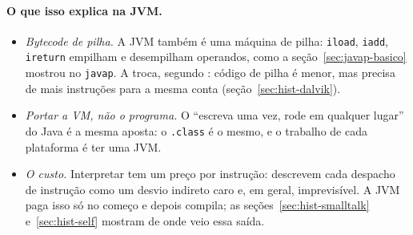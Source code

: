 \paragraph{O que isso explica na JVM.}
\begin{itemize}
\item \emph{Bytecode de pilha.} A JVM também é uma máquina de pilha:
  \texttt{iload}, \texttt{iadd}, \texttt{ireturn} empilham e desempilham
  operandos, como a seção~\ref{sec:javap-basico} mostrou no
  \texttt{javap}. A troca, segundo \textcite{paper:vm-showdown}: código
  de pilha é menor, mas precisa de mais instruções para a mesma conta
  (seção~\ref{sec:hist-dalvik}).
\item \emph{Portar a VM, não o programa.} O \enquote{escreva uma vez, rode
  em qualquer lugar} do Java é a mesma aposta: o \texttt{.class} é o
  mesmo, e o trabalho de cada plataforma é ter uma JVM.
\item \emph{O custo.} Interpretar tem um preço por instrução:
  \textcite{paper:vm-showdown} descrevem cada despacho de instrução como
  um desvio indireto caro e, em geral, imprevisível. A JVM paga isso só
  no começo e depois compila; as seções~\ref{sec:hist-smalltalk}
  e~\ref{sec:hist-self} mostram de onde veio essa saída.
\end{itemize}

